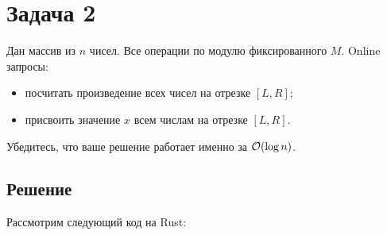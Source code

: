 \section{Задача 2}
Дан массив из $n$ чисел. Все операции по модулю фиксированного $M$.
Online запросы:
\begin{itemize}
    \item посчитать произведение всех чисел на отрезке $[L, R]$;
    \item присвоить значение $x$ всем числам на отрезке $[L, R]$.
\end{itemize}

Убедитесь, что ваше решение работает именно за $\mathcal{O}(\log n)$.

\subsection{Решение}
Рассмотрим следующий код на Rust:
\inputminted[firstline=5]{rust}{code/src/task02/mod.rs}
